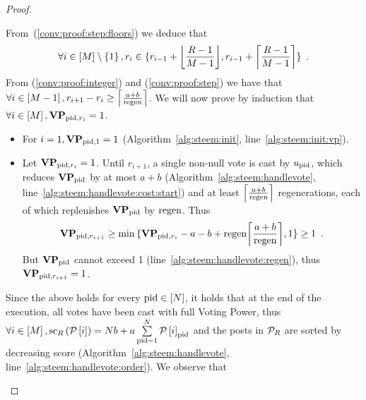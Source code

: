 \documentclass[a4paper,english,cleveref, autoref]{oasics-v2019}
\begin{document}
\begin{subappendices}
\begin{proof}
\begin{itemize}
    From~(\ref{conv:proof:step:floors}) we deduce that
    \begin{equation}
      \label{conv:proof:step}
      \forall i \in \left[\postlen\right] \setminus \left\{1\right\}, r_i \in
      \{r_{i - 1} + \floor*{\frac{\rounds - 1}{\postlen - 1}}, r_{i - 1} +
      \ceil*{\frac{\rounds - 1}{\postlen - 1}}\} \enspace.
    \end{equation}
    From (\ref{conv:proof:integer}) and (\ref{conv:proof:step}) we have that
    $\forall i \in \left[\postlen - 1\right], r_{i+1} - r_i \geq
    \ceil*{\frac{a+b}{\regen}}$. We will now prove by induction that $\forall i
    \in \left[\postlen\right], \votpowvec_{\pid, r_i} = 1$.

    \begin{itemize}
      \item For $i = 1, \votpowvec_{\pid, 1} = 1$
      (Algorithm~\ref{alg:steem:init}, line~\ref{alg:steem:init:vp}).
      \item Let $\votpowvec_{\pid, r_i} = 1$. Until $r_{i + 1}$, a single
      non-null vote is cast by $u_\pid$, which reduces $\votpowvec_{\pid}$ by at
      most $a + b$ (Algorithm~\ref{alg:steem:handlevote},
      line~\ref{alg:steem:handlevote:cost:start}) and at least $\ceil*{\frac{a +
      b}{\regen}}$ regenerations, each of which replenishes $\votpowvec_{\pid}$
      by $\regen$. Thus
      \begin{equation*}
        \votpowvec_{\pid, r_{i + 1}} \geq \min{\{\votpowvec_{\pid, r_i} - a
        - b + \regen\ceil*{\frac{a + b}{\regen}}, 1\}} \geq 1 \enspace.
      \end{equation*}
      But $\votpowvec_{\pid}$ cannot exceed 1
      (line~\ref{alg:steem:handlevote:regen}), thus $\votpowvec_{\pid, r_{i +
      1}} = 1$.
    \end{itemize}
    Since the above holds for every $\pid \in \left[\playerlen\right]$, it holds
    that at the end of the execution, all votes have been cast with full Voting
    Power, thus $\forall i \in \left[\postlen\right],
    \mathrm{sc}_{\rounds}\left(\postlist\left[i\right]\right) =
    \playerlen b + a \sum\limits_{\pid = 1}^\playerlen
    \postlist\left[i\right]_{\pid}$ and the posts in $\postlist_R$ are sorted by
    decreasing score (Algorithm~\ref{alg:steem:handlevote},
    line~\ref{alg:steem:handlevote:order}). We observe that


\end{itemize}
\end{proof}
\end{subappendices}
\end{document}
